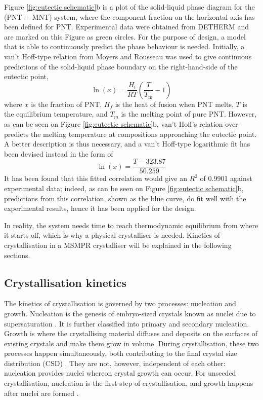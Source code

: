 Figure \ref{fig:eutectic schematic}b is a plot of the solid-liquid phase diagram for the (PNT + MNT) system, where the component fraction on the horizontal axis has been defined for PNT. Experimental data were obtained from DETHERM \cite{noauthor_detherm_2021} and are marked on this Figure as green circles. For the purpose of design, a model that is able to continuously predict the phase behaviour is needed. Initially, a van't Hoff-type relation from Moyers and Rousseau was used to give continuous predictions of the solid-liquid phase boundary on the right-hand-side of the eutectic point, \cite{moyers_crystallization_1987}
\begin{equation}\label{eq:vantHoff}
    \ln(x) = \frac{H_{\mathrm{f}}}{R T}\left(\frac{T}{T_{\mathrm{m}}} - 1\right)
\end{equation}
where $x$ is the fraction of PNT, $H_f$ is the heat of fusion when PNT melts, $T$ is the equilibrium temperature, and $T_{m}$ is the melting point of pure PNT. However, as can be seen on Figure \ref{fig:eutectic schematic}b, van't Hoff's relation over-predicts the melting temperature at compositions approaching the eutectic point. A better description is thus necessary, and a van't Hoff-type logarithmic fit has been devised instead in the form of 
\begin{equation} \label{eq:fittedvantHoffcorrelation}
    \ln(x) = \frac{T - 323.87}{50.259}
\end{equation}
It has been found that this fitted correlation would give an $R^2$ of 0.9901 against experimental data; indeed, as can be seen on Figure \ref{fig:eutectic schematic}b, predictions from this correlation, shown as the blue curve, do fit well with the experimental results, hence it has been applied for the design.

In reality, the system needs time to reach thermodynamic equilibrium from where it starts off, which is why a physical crystalliser is needed. Kinetics of crystallisation in a MSMPR crystalliser will be explained in the following sections.

\subsection{Crystallisation kinetics} \label{sec: Crystallisation kinetics}
The kinetics of crystallisation is governed by two processes: nucleation and growth. Nucleation is the genesis of embryo-sized crystals known as nuclei due to supersaturation \cite{richardson_chemical_2006}. It is further classified into primary and secondary nucleation. Growth is where the crystallising material diffuses and deposits on the surfaces of existing crystals and make them grow in volume. During crystallisation, these two processes happen simultaneously, both contributing to the final crystal size distribution (CSD) \cite{richardson_chemical_2006}. They are not, however, independent of each other: nucleation provides nuclei whereon crystal growth can occur. For unseeded crystallisation, nucleation is the first step of crystallisation, and growth happens after nuclei are formed \cite{mullin_crystallization_2001}.


